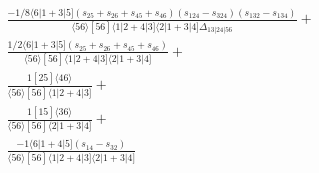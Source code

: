 \documentclass[varwidth, border=5pt]{standalone}
\begin{document}
\begin{my}
$\begin{gathered}
\scriptscriptstyle\frac{-1/8⟨6|1+3|5](s_{25}+s_{26}+s_{45}+s_{46})(s_{124}-s_{324})(s_{132}-s_{134})}{⟨56⟩[56]⟨1|2+4|3]⟨2|1+3|4]Δ_{13|24|56}}+\\
\scriptscriptstyle\frac{1/2⟨6|1+3|5](s_{25}+s_{26}+s_{45}+s_{46})}{⟨56⟩[56]⟨1|2+4|3]⟨2|1+3|4]}+\\
\scriptscriptstyle\frac{1[25]⟨46⟩}{⟨56⟩[56]⟨1|2+4|3]}+\\
\scriptscriptstyle\frac{1[15]⟨36⟩}{⟨56⟩[56]⟨2|1+3|4]}+\\
\scriptscriptstyle\frac{-1⟨6|1+4|5](s_{14}-s_{32})}{⟨56⟩[56]⟨1|2+4|3]⟨2|1+3|4]}\phantom{+}
\end{gathered}$
\end{my}
\end{document}
